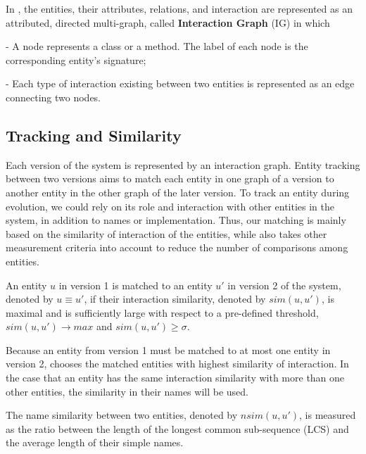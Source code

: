 In {\tool}, the entities, their attributes, relations, and
interaction are represented as an attributed, directed multi-graph,
called {\bf Interaction Graph} (IG) in which

- A node represents a class or a method. The label of each node is the
  corresponding entity's signature;

- Each type of interaction existing between two entities is
  represented as an edge connecting two nodes.

\subsection{Tracking and Similarity}

Each version of the system is represented by an interaction
graph. Entity tracking between two versions aims to match each entity
in one graph of a version to another entity in the other graph of the
later version. 
To track an entity during evolution, we could rely on its role and
interaction with other entities in the system, in addition to names or
implementation. Thus, our matching is mainly based on the similarity
of interaction of the entities, while also takes other measurement
criteria into account to reduce the number of comparisons among
entities.


\begin{Definition}
An entity $u$ in version 1 is matched to an entity $u'$ in version 2 of the system, denoted by $u \equiv u'$, if their interaction similarity, denoted by $sim(u,u')$, is maximal and is sufficiently large with respect to a pre-defined
threshold, \ie $sim(u,u') \rightarrow max$ and $sim(u,u') \geq
\sigma$.
\end{Definition}

Because an entity from version 1 must be matched to at most one entity
in version 2, {\tool} chooses the matched entities with highest
similarity of interaction. In the case that an entity has the same
interaction similarity with more than one other entities, the
similarity in their names will be used.

\begin{Definition}
The name similarity between two entities, denoted by $nsim(u,u')$, is
measured as the ratio between the length of the longest common
sub-sequence (LCS) and the average length of their simple names.
\end{Definition}

